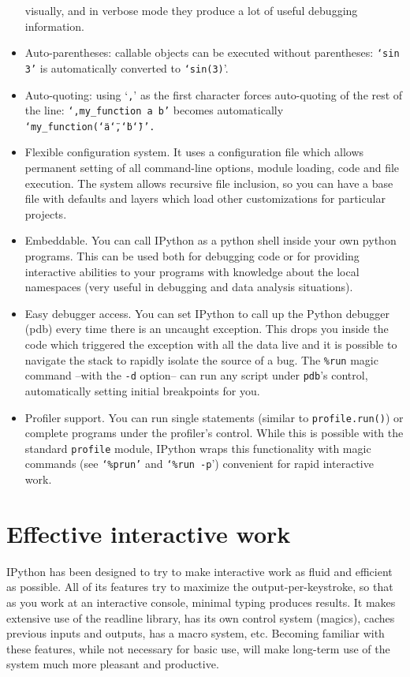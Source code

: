 \begin{itemize}
visually, and in verbose mode they produce a lot of useful debugging
information.
\item Auto-parentheses: callable objects can be executed without parentheses:
\texttt{`sin 3'} is automatically converted to \texttt{`sin(3)}'.
\item Auto-quoting: using `\texttt{,}' as the first character forces auto-quoting
of the rest of the line: \texttt{`,my\_function a b'} becomes automatically
\texttt{`my\_function(\char`\"{}a\char`\"{},\char`\"{}b\char`\"{})'.}
\item Flexible configuration system. It uses a configuration file which
allows permanent setting of all command-line options, module loading,
code and file execution. The system allows recursive file inclusion,
so you can have a base file with defaults and layers which load other
customizations for particular projects.
\item Embeddable. You can call IPython as a python shell inside your own
python programs. This can be used both for debugging code or for providing
interactive abilities to your programs with knowledge about the local
namespaces (very useful in debugging and data analysis situations).
\item Easy debugger access. You can set IPython to call up the Python debugger
(pdb) every time there is an uncaught exception. This drops you inside
the code which triggered the exception with all the data live and
it is possible to navigate the stack to rapidly isolate the source
of a bug. The \texttt{\%run} magic command --with the \texttt{-d}
option-- can run any script under \texttt{pdb}'s control, automatically
setting initial breakpoints for you.
\item Profiler support. You can run single statements (similar to \texttt{profile.run()})
or complete programs under the profiler's control. While this is possible
with the standard \texttt{profile} module, IPython wraps this functionality
with magic commands (see \texttt{`\%prun'} and \texttt{`\%run -p}')
convenient for rapid interactive work.
\end{itemize}

\section[Interactive use]{Effective interactive work }

IPython has been designed to try to make interactive work as fluid
and efficient as possible. All of its features try to maximize the
output-per-keystroke, so that as you work at an interactive console,
minimal typing produces results. It makes extensive use of the readline
library, has its own control system (magics), caches previous inputs
and outputs, has a macro system, etc. Becoming familiar with these
features, while not necessary for basic use, will make long-term use
of the system much more pleasant and productive.


